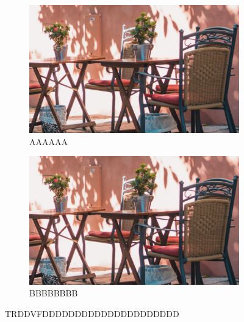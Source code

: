 \begin{figure}[!htb]
  \centering

  \begin{subfigure}{0.49\textwidth}
    \includegraphics[width=\linewidth]{figs/test_fig}
    \captionsetup{justification=centering}
    \caption{AAAAAA}
    \label{aaa}
  \end{subfigure}
  \begin{subfigure}{0.49\textwidth}
    \includegraphics[width=\linewidth]{figs/test_fig}
    \captionsetup{justification=centering}
    \caption{BBBBBBBB}
    \label{bbb}
  \end{subfigure}
    \caption{TRDDVFDDDDDDDDDDDDDDDDDDDDD }
      \label{ss}
\end{figure}




